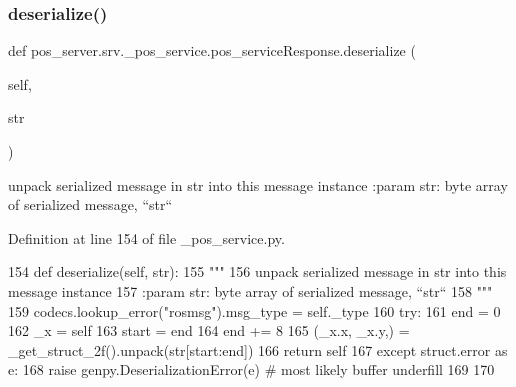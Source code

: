 \subsubsection{\texorpdfstring{deserialize()}{deserialize()}}
{\footnotesize\ttfamily def pos\+\_\+server.\+srv.\+\_\+pos\+\_\+service.\+pos\+\_\+service\+Response.\+deserialize (\begin{DoxyParamCaption}\item[{}]{self,  }\item[{}]{str }\end{DoxyParamCaption})}

\begin{DoxyVerb}unpack serialized message in str into this message instance
:param str: byte array of serialized message, ``str``
\end{DoxyVerb}
 

Definition at line 154 of file \+\_\+pos\+\_\+service.\+py.


\begin{DoxyCode}
154   \textcolor{keyword}{def }deserialize(self, str):
155     \textcolor{stringliteral}{"""}
156 \textcolor{stringliteral}{    unpack serialized message in str into this message instance}
157 \textcolor{stringliteral}{    :param str: byte array of serialized message, ``str``}
158 \textcolor{stringliteral}{    """}
159     codecs.lookup\_error(\textcolor{stringliteral}{"rosmsg"}).msg\_type = self.\_type
160     \textcolor{keywordflow}{try}:
161       end = 0
162       \_x = self
163       start = end
164       end += 8
165       (\_x.x, \_x.y,) = \_get\_struct\_2f().unpack(str[start:end])
166       \textcolor{keywordflow}{return} self
167     \textcolor{keywordflow}{except} struct.error \textcolor{keyword}{as} e:
168       \textcolor{keywordflow}{raise} genpy.DeserializationError(e)  \textcolor{comment}{# most likely buffer underfill}
169 
170 
\end{DoxyCode}
\mbox{\label{classpos__server_1_1srv_1_1__pos__service_1_1pos__serviceResponse_a764cf16549b8ac03af2308938df6e856}} 
